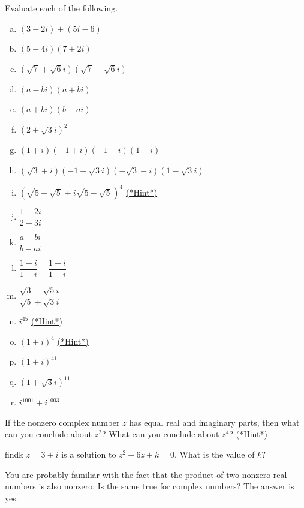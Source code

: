 \begin{exercise}{9}
Evaluate each of the following.
\begin{multicols}{2}
\begin{enumerate}[(a)]
\item
$(3-2i)+ (5i-6)$
\item
$(5-4i)(7+2i)$
\item
$(\sqrt{7} + \sqrt{6}i)(\sqrt{7} - \sqrt{6}i)$
\item
$(a - bi)(a + bi)$
\item
$(a + bi)(b + ai)$
\item
$(2 + \sqrt{3}i)^2$
\item
$(1+i)(-1+i)(-1-i)(1-i)$
\item
$(\sqrt{3}+i)(-1+ \sqrt{3}i)(-\sqrt{3}-i)(1 -\sqrt{3}i)$
\item
$\left(\sqrt{5 + \sqrt{5}} + i\sqrt{5 - \sqrt{5}}\right)^4$
\hyperref[sec:complex:hints]{(*Hint*)}
\item
$\dfrac{1+2i}{2-3i}$
\item
$\dfrac{a+bi}{b-ai}$
\item
$\dfrac{1+i}{1-i} + \dfrac{1-i}{1+i}$
\item
$\dfrac{\sqrt{3} - \sqrt{5}i}{\sqrt{5} + \sqrt{3}i}$
 \item
$i^{45}$
\hyperref[sec:complex:hints]{(*Hint*)}
\item
$(1 + i)^4$  
\hyperref[sec:complex:hints]{(*Hint*)}
\item
$(1 + i)^{41}$
\item
$(1 + \sqrt{3}i)^{11}$
\item
$i^{1001} + i^{1003}$
\end{enumerate}
\end{multicols}
\end{exercise}

\begin{exercise}{10}
If the nonzero complex number $z$ has equal real and imaginary parts, then what can you conclude about $z^2$?   What can you conclude about $z^4$? 
\hyperref[sec:complex:hints]{(*Hint*)}
\end{exercise}

\begin{exercise}{findk}
$z = 3+i$ is a solution to $z^2 - 6z + k = 0$.  What is the value of $k$?
\end{exercise}


You are probably familiar with the fact that the product of two nonzero real numbers is also nonzero. Is the same true for complex numbers? The answer is yes.

